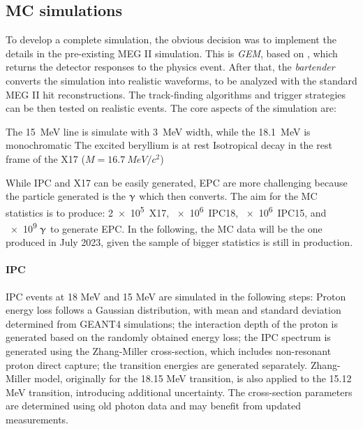\begin{refsection}
    \subsection{MC simulations}
        To develop a complete simulation, the obvious decision was to implement the details in the pre-existing MEG II simulation.
        This is \textit{GEM}, based on \gf, which returns the detector responses to the physics event. 
        After that, the \textit{bartender} converts the simulation into realistic waveforms, to be analyzed with the standard MEG II hit reconstructions.
        The track-finding algorithms and trigger strategies can be then tested on realistic events.
        The core aspects of the simulation are:
        \begin{outline}
            \1 The \SI{15}{MeV} line is simulate with \SI{3}{MeV} width, while the \SI{18.1}{MeV} is monochromatic
            \1 The excited beryllium is at rest
            \1 Isotropical decay in the rest frame of the X17 ($M=\SI{16.7}{MeV/c^2}$)
        \end{outline}     
        While IPC and X17 can be easily generated, EPC are more challenging because the particle generated is the $\upgamma$ which then converts.
        The aim for the MC statistics is to produce: \SI{2e5}{X17}, \SI{e6}{IPC18}, \SI{e6}{IPC15}, and \num{e9} $\upgamma$ to generate EPC.
        In the following, the MC data will be the one produced in July 2023, given the sample of bigger statistics is still in production.

        \paragraph{IPC}
        IPC events at 18 MeV and 15 MeV are simulated in the following steps: Proton energy loss follows a Gaussian distribution, with mean and standard deviation determined from GEANT4 simulations; 
        the interaction depth of the proton is generated based on the randomly obtained energy loss;
        the IPC spectrum is generated using the Zhang-Miller cross-section, which includes non-resonant proton direct capture;
        the transition energies are generated separately. Zhang-Miller model, originally for the 18.15 MeV transition, is also applied to the 15.12 MeV transition, introducing additional uncertainty. The cross-section parameters are determined using old photon data and may benefit from updated measurements.
    

\end{refsection}

